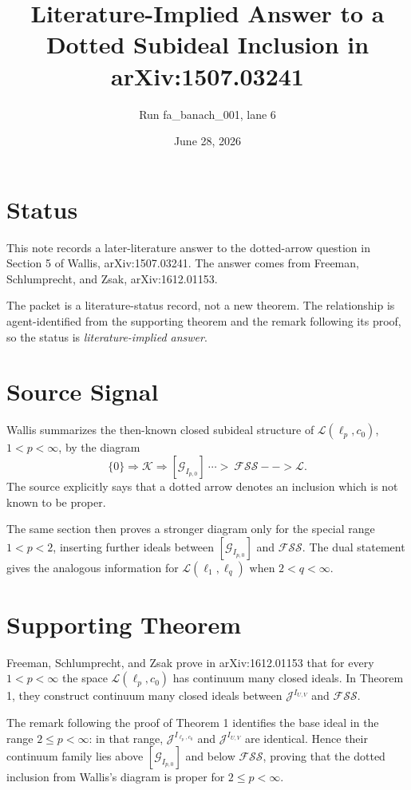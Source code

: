 \documentclass[11pt]{article}
\title{Literature-Implied Answer to a Dotted Subideal Inclusion in arXiv:1507.03241}
\author{Run fa\_banach\_001, lane 6}
\date{June 28, 2026}
\begin{document}
\maketitle

\section*{Status}

This note records a later-literature answer to the dotted-arrow question in
Section 5 of Wallis, arXiv:1507.03241. The answer comes from Freeman,
Schlumprecht, and Zsak, arXiv:1612.01153.

The packet is a literature-status record, not a new theorem. The relationship
is agent-identified from the supporting theorem and the remark following its
proof, so the status is \emph{literature-implied answer}.

\section*{Source Signal}

Wallis summarizes the then-known closed subideal structure of
$\mathcal L(\ell_p,c_0)$, $1<p<\infty$, by the diagram
\[
\{0\}\Rightarrow \mathcal K \Rightarrow
[\mathcal G_{I_{p,0}}] \ \cdots\!\!\!>\  \mathcal{FSS}
--\!\!\!>\mathcal L .
\]
The source explicitly says that a dotted arrow denotes an inclusion which is
not known to be proper.

The same section then proves a stronger diagram only for the special range
$1<p<2$, inserting further ideals between $[\mathcal G_{I_{p,0}}]$ and
$\mathcal{FSS}$. The dual statement gives the analogous information for
$\mathcal L(\ell_1,\ell_q)$ when $2<q<\infty$.

\section*{Supporting Theorem}

Freeman, Schlumprecht, and Zsak prove in arXiv:1612.01153 that for every
$1<p<\infty$ the space $\mathcal L(\ell_p,c_0)$ has continuum many closed
ideals. In Theorem 1, they construct continuum many closed ideals between
$\mathcal J^{I_{U,V}}$ and $\mathcal{FSS}$.

The remark following the proof of Theorem 1 identifies the base ideal in the
range $2\leq p<\infty$: in that range, $\mathcal J^{I_{\ell_p,c_0}}$ and
$\mathcal J^{I_{U,V}}$ are identical. Hence their continuum family lies above
$[\mathcal G_{I_{p,0}}]$ and below $\mathcal{FSS}$, proving that the dotted
inclusion from Wallis's diagram is proper for $2\leq p<\infty$.
\end{document}
